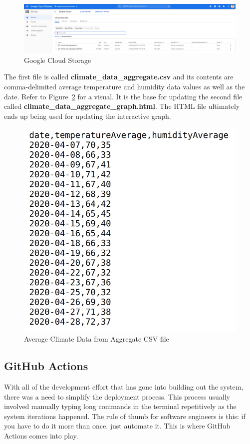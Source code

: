\documentclass{article}
\begin{document}
\begin{figure}[H]
    \center
    \includegraphics[width=\textwidth]{images/storage.png}
    \caption{Google Cloud Storage}
    \label{fig:storage}
\end{figure}

The first file is called \textbf{climate\_data\_aggregate.csv} and its contents are comma-delimited average temperature and humidity data values as well as the date. Refer to Figure~\ref{fig:climate-data} for a visual. It is the base for updating the second file called \textbf{climate\_data\_aggregate\_graph.html}. The HTML file ultimately ends up being used for updating the interactive graph.

\begin{figure}[H]
    \center
    \includegraphics[width=.6\textwidth]{images/climate-data-csv.png}
    \caption{Average Climate Data from Aggregate CSV file}
    \label{fig:climate-data}
\end{figure}

\subsection{GitHub Actions}
With all of the development effort that has gone into building out the system, there was a need to simplify the deployment process. This process usually involved manually typing long commands in the terminal repetitively as the system iterations happened. The rule of thumb for software engineers is this: if you have to do it more than once, just automate it. This is where GitHub Actions comes into play.\\
\end{document}
